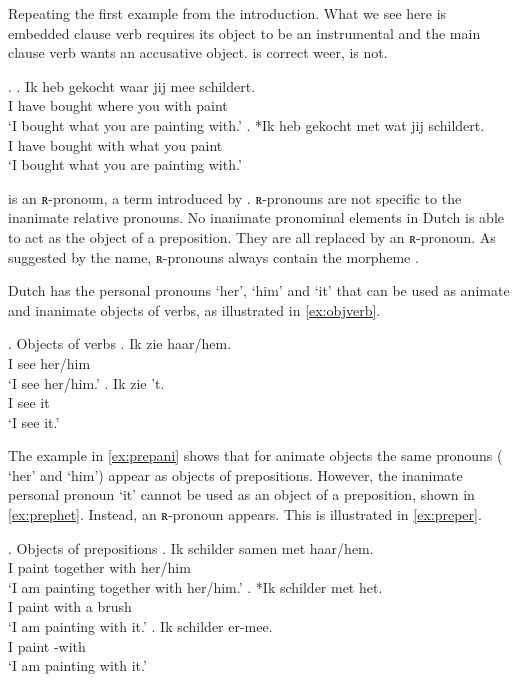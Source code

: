\documentclass{article}
\begin{document}
Repeating the first example from the introduction. What we see here is embedded clause verb requires its object to be an instrumental and the main clause verb wants an accusative object.  is correct weer,  is not.

\ex.
\ag. Ik heb gekocht waar jij mee schildert.\\
 I have bought where you with paint\\
 `I bought what you are painting with.'
\bg. *Ik heb gekocht met wat jij schildert.\\
 I have bought with what you paint\\
 `I bought what you are painting with.'

  is an ʀ-pronoun, a term introduced by \cite{riemsdijk1978}. ʀ-pronouns are not specific to the inanimate relative pronouns. No inanimate pronominal elements in Dutch is able to act as the object of a preposition. They are all replaced by an ʀ-pronoun. As suggested by the name, ʀ-pronouns always contain the morpheme .

 Dutch has the personal pronouns  `her',  `him' and  `it' that can be used as animate and inanimate objects of verbs, as illustrated in \ref{ex:objverb}.

 \ex. Objects of verbs \label{ex:objverb}
 \ag. Ik zie haar/hem.\\
  I see her/him\\
  `I see her/him.'\label{ex:aniobj}
 \bg. Ik zie 't.\\
  I see it\\
  `I see it.'\label{ex:inaniobj}

The example in \ref{ex:prepani} shows that for animate objects the same pronouns ( `her' and  `him') appear as objects of prepositions. However, the inanimate personal pronoun  `it' cannot be used as an object of a preposition, shown in \ref{ex:prephet}. Instead, an ʀ-pronoun appears. This is illustrated in \ref{ex:preper}.

\ex. Objects of prepositions \label{ex:objprep}
\ag. Ik schilder samen met haar/hem.\\
 I paint together with her/him\\
 `I am painting together with her/him.'\label{ex:prepani}
\bg. *Ik schilder met het.\\
 I paint with a brush\\
 `I am painting with it.'\label{ex:prephet}
\bg. Ik schilder er-mee.\\
 I paint -with\\
 `I am painting with it.'\label{ex:preper}
\end{document}
